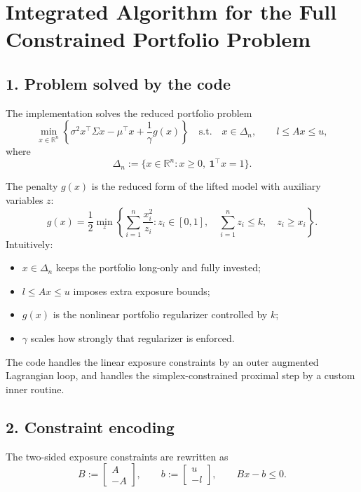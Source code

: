\documentclass[11pt]{article}
\begin{document}
\section*{Integrated Algorithm for the Full Constrained Portfolio Problem}

\subsection*{1. Problem solved by the code}

The implementation solves the reduced portfolio problem
\[
\min_{x \in \mathbb{R}^n}
\left\{
\sigma^2 x^\top \Sigma x - \mu^\top x + \frac{1}{\gamma} g(x)
\right\}
\quad
\text{s.t.}
\quad
x \in \Delta_n,
\qquad
l \le Ax \le u,
\]
where
\[
\Delta_n := \{x \in \mathbb{R}^n : x \ge 0,\ \mathbf{1}^\top x = 1\}.
\]

The penalty \(g(x)\) is the reduced form of the lifted model with auxiliary
variables \(z\):
\[
g(x)
=
\frac12 \min_{z}
\left\{
\sum_{i=1}^n \frac{x_i^2}{z_i}
:
z_i \in [0,1],\quad
\sum_{i=1}^n z_i \le k,\quad
z_i \ge x_i
\right\}.
\]
Intuitively:
\begin{itemize}[topsep=0.3em,itemsep=0.2em]
\item \(x \in \Delta_n\) keeps the portfolio long-only and fully invested;
\item \(l \le Ax \le u\) imposes extra exposure bounds;
\item \(g(x)\) is the nonlinear portfolio regularizer controlled by \(k\);
\item \(\gamma\) scales how strongly that regularizer is enforced.
\end{itemize}

The code handles the linear exposure constraints by an outer augmented
Lagrangian loop, and handles the simplex-constrained proximal step by a custom
inner routine.

\subsection*{2. Constraint encoding}

The two-sided exposure constraints are rewritten as
\[
B :=
\begin{bmatrix}
A \\
-A
\end{bmatrix},
\qquad
b :=
\begin{bmatrix}
u \\
-l
\end{bmatrix},
\qquad
Bx - b \le 0.
\]
\end{document}

